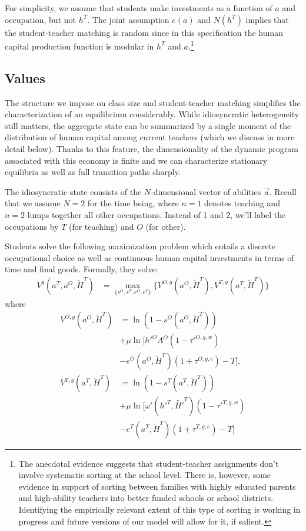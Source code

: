 \documentclass[onehalfspacing,11pt]{article}
\begin{document}
For simplicity, we assume that students make investments as a function of $a$ and occupation, but not $h^T$. The joint assumption $e(a)$ and $N(h^T)$ implies that the student-teacher matching is random since in this specification the human capital production function is modular in $h^T$ and $a$.\footnote{The anecdotal evidence suggests that student-teacher assignments don't involve systematic sorting at the school level. There is, however, some evidence in support of sorting between families with highly educated parents and high-ability teachers into better funded schools or school districts. Identifying the empirically relevant extent of this type of sorting is working in progress and future versions of our model will allow for it, if salient.}

\subsection{Values}
The structure we impose on class size and student-teacher matching simplifies the characterization of an equilibrium considerably. While idiosyncratic heterogeneity still matters, the aggregate state can be summarized by a single moment of the distribution of human capital among current teachers (which we discuss in more detail below). Thanks to this feature, the dimensionality of the dynamic program associated with this economy is finite and we can characterize stationary equilibria as well as full transition paths sharply.

The idiosyncratic state consists of the $N$-dimensional vector of abilities $\vec{a}$. Recall that we assume $N=2$ for the time being, where $n=1$ denotes teaching and $n=2$ lumps together all other occupations. Instead of 1 and 2, we'll label the occupations by $T$ (for teaching) and $O$ (for other).

Students solve the following maximization problem which entails a discrete occupational choice as well as continuous human capital investments in terms of time and final goods. Formally, they solve:
\begin{align*}
V^g(a^T,a^O,\widetilde{H}^T) & = \max_{\{s^{O},s^{T},e^{O},e^{T}\}} \bigg\{ V^{O,g}(a^O,\widetilde{H}^T), V^{T,g}(a^T,\widetilde{H}^T) \bigg\}
\end{align*}
where
\begin{align*}
V^{O,g}(a^O,\widetilde{H}^T) & = \ln\left(1-s^O\left(a^O,\widetilde{H}^T\right)\right) \\
& + \mu \ln \Big[ {{h'}^{O}} A^O(1-{{\tau'}^{O,g,w}}) \\
& - e^O(a^O,\widetilde{H}^T)(1+\tau^{O,g,e}) - T \Big],  \\
V^{T,g}(a^T,\widetilde{H}^T) & = \ln\left(1-s^T\left(a^T,\widetilde{H}^T\right)\right)  \\
& + \mu \ln \Big[ \omega'({{h'}^{T}},{\widetilde{H'}^{T}})(1-{{\tau'}^{T,g,w}})  \\
& - e^T(a^T,\widetilde{H}^T)(1+\tau^{T,g,e}) - T \Big] 
\end{align*}
\end{document}
